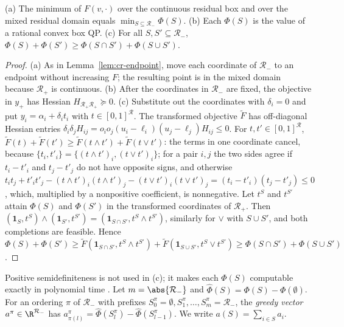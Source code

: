 \begin{proposition}\label{prop:cr-submod}
(a) The minimum of $F(v,\cdot)$ over the continuous residual box and over
the mixed residual domain equals $\min_{S\subseteq\mathcal R_-}\Phi(S)$.
(b) Each $\Phi(S)$ is the value of a rational convex box QP.
(c) For all $S,S'\subseteq\mathcal R_-$,
$\Phi(S)+\Phi(S')\ge\Phi(S\cap S')+\Phi(S\cup S')$.
\end{proposition}

\begin{proof}
(a) As in Lemma~\ref{lem:cr-endpoint}, move each coordinate of
$\mathcal R_-$ to an endpoint without increasing $F$; the resulting point is
in the mixed domain because $\mathcal R_+$ is continuous. (b) After the
coordinates in $\mathcal R_-$ are fixed, the objective in $y_+$ has Hessian
$H_{\mathcal R_+\mathcal R_+}\succeq0$.
(c) Substitute out the coordinates with $\delta_i=0$ and put
$y_i=\alpha_i+\delta_it_i$ with $t\in[0,1]^{\mathcal R}$. The transformed
objective $\tilde F$ has off-diagonal Hessian entries
$\delta_i\delta_jH_{ij}=o_io_j(u_i-\ell_i)(u_j-\ell_j)H_{ij}\le0$. For
$t,t'\in[0,1]^{\mathcal R}$,
$\tilde F(t)+\tilde F(t')\ge\tilde F(t\wedge t')+\tilde F(t\vee t')$: the
terms in one coordinate cancel, because $\{t_i,t'_i\}=\{(t\wedge
t')_i,(t\vee t')_i\}$; for a pair $i,j$ the two sides agree if $t_i-t'_i$ and
$t_j-t'_j$ do not have opposite signs, and otherwise
$t_it_j+t'_it'_j-(t\wedge t')_i(t\wedge t')_j-(t\vee t')_i(t\vee t')_j
=(t_i-t'_i)(t_j-t'_j)\le0$, which, multiplied by a nonpositive coefficient,
is nonnegative. Let $t^S$ and $t^{S'}$ attain $\Phi(S)$ and $\Phi(S')$ in
the transformed coordinates of $\mathcal R_+$. Then
$(\mathbf 1_S,t^S)\wedge(\mathbf 1_{S'},t^{S'})
=(\mathbf 1_{S\cap S'},t^S\wedge t^{S'})$, similarly for $\vee$ with
$S\cup S'$, and both completions are feasible. Hence
$\Phi(S)+\Phi(S')\ge\tilde F(\mathbf 1_{S\cap S'},t^S\wedge t^{S'})
+\tilde F(\mathbf 1_{S\cup S'},t^S\vee t^{S'})\ge\Phi(S\cap S')+\Phi(S\cup S')$.
\end{proof}

Positive semidefiniteness is not used in (c); it makes each $\Phi(S)$
computable exactly in polynomial time \cite{KozlovTarasovKhachiyan1980}.
Let $m=\abs{\mathcal R_-}$ and $\hat\Phi(S)=\Phi(S)-\Phi(\emptyset)$. For an
ordering $\pi$ of $\mathcal R_-$ with prefixes
$S^\pi_0=\emptyset,S^\pi_1,\dots,S^\pi_m=\mathcal R_-$, the \emph{greedy
vector} $a^\pi\in\R^{\mathcal R_-}$ has
$a^\pi_{\pi(l)}=\hat\Phi(S^\pi_l)-\hat\Phi(S^\pi_{l-1})$. We write
$a(S)=\sum_{i\in S}a_i$.

